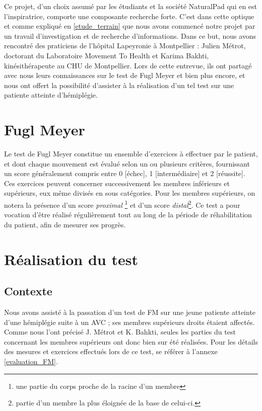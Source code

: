 Ce projet, d'un choix assumé par les étudiants et la société NaturalPad qui en est l'inspiratrice, comporte 
une composante recherche forte. C'est dans cette optique et comme expliqué en \ref{etude_terrain} que nous avons 
commencé notre projet par un travail d'investigation et de recherche d'informations. Dans ce but, nous avons rencontré 
des praticiens de l'hôpital Lapeyronie à Montpellier : Julien Métrot, doctorant du Laboratoire Movement To Health et 
Karima Bakhti, kinésithérapeute au CHU de Montpellier. Lors de cette entrevue, ils ont partagé avec nous leurs 
connaissances sur le test de Fugl Meyer et bien plus encore, et nous ont offert la possibilité d'assister à la 
réalisation d'un tel test sur une patiente atteinte d'hémiplégie.
  \section{Fugl Meyer}\label{fugl_meyer}
Le test de Fugl Meyer constitue un ensemble d'exercices à effectuer par le patient, et dont chaque mouvement est 
évalué selon un ou plusieurs critères, fournissant un score généralement compris entre 0 [échec], 1 [intermédiaire]
et 2 [réussite]. Ces exercices peuvent concerner successivement les membres inférieurs et supérieurs, eux même divisés 
en sous catégories. Pour les membres supérieurs, on notera la présence d'un score \textit{proximal}
\footnote{une partie du corps proche de la racine d'un membre} et d'un score
\textit{distal}\footnote{partie d'un membre la plus éloignée de la base de celui-ci.}. 
Ce test a pour vocation d'être réalisé régulièrement tout au long de la période de réhabilitation
du patient, afin de mesurer ses progrès.
  \section{Réalisation du test}
        \subsection{Contexte}
Nous avons assisté à la passation d'un test de FM sur une jeune patiente atteinte d'une hémiplégie suite à un AVC ; 
ses membres supérieurs droits étaient affectés. Comme nous l'ont précisé J. Métrot et K. Bahkti, seules les parties 
du test concernant les membres supérieurs ont donc bien sur été réalisées. Pour les détails des mesures et exercices 
effectués lors de ce test, se référer à l'annexe \ref{evaluation_FM}.

